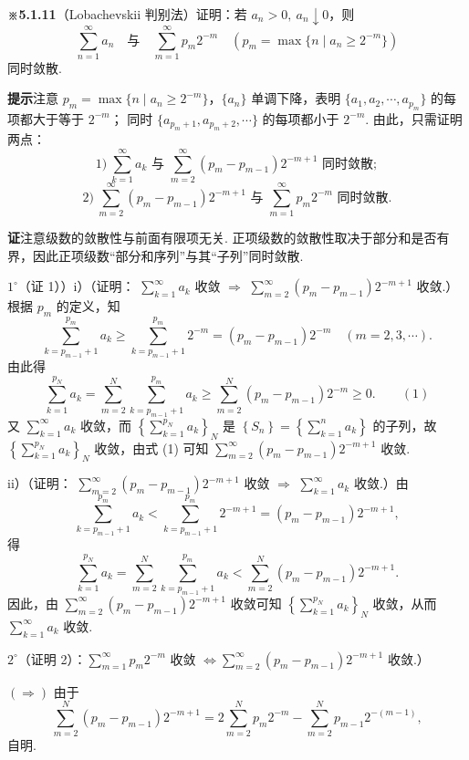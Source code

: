 \documentclass[UTF8,12pt,a4paper,fontset=fandol]{ctexart}
\begin{document}
\noindent\textbf{※5.1.11}\quad （Lobachevskii 判别法）证明：若 $a_n>0,\ a_n\downarrow0$，则
\[
  \sum_{n=1}^{\infty}a_n\quad\text{与}\quad
  \sum_{m=1}^{\infty}p_m2^{-m}\quad
  (p_m=\max\{n\mid a_n\ge2^{-m}\})
\]
同时敛散.

\noindent\textbf{提示}\quad 注意 $p_m=\max\{n\mid a_n\ge2^{-m}\}$，$\{a_n\}$ 单调下降，表明
$\{a_1,a_2,\cdots,a_{p_m}\}$ 的每项都大于等于 $2^{-m}$；
同时 $\{a_{p_m+1},a_{p_m+2},\cdots\}$ 的每项都小于 $2^{-m}$.
由此，只需证明两点：
\[
  1)\ \sum_{k=1}^{\infty}a_k\text{ 与 }
  \sum_{m=2}^{\infty}(p_m-p_{m-1})2^{-m+1}\text{ 同时敛散};
\]
\[
  2)\ \sum_{m=2}^{\infty}(p_m-p_{m-1})2^{-m+1}\text{ 与 }
  \sum_{m=1}^{\infty}p_m2^{-m}\text{ 同时敛散}.
\]

\noindent\textbf{证}\quad 注意级数的敛散性与前面有限项无关. 正项级数的敛散性取决于部分和是否有界，因此正项级数“部分和序列”与其“子列”同时敛散.

$1^\circ$（证 1））i）（证明：
$\sum_{k=1}^{\infty}a_k$ 收敛 $\Rightarrow$
$\sum_{m=2}^{\infty}(p_m-p_{m-1})2^{-m+1}$ 收敛.）根据 $p_m$ 的定义，知
\[
  \sum_{k=p_{m-1}+1}^{p_m}a_k
  \ge \sum_{k=p_{m-1}+1}^{p_m}2^{-m}
  =(p_m-p_{m-1})2^{-m}\quad(m=2,3,\cdots).
\]
由此得
\[
  \sum_{k=1}^{p_N}a_k
  =\sum_{m=2}^N\sum_{k=p_{m-1}+1}^{p_m}a_k
  \ge\sum_{m=2}^N(p_m-p_{m-1})2^{-m}\ge0.
\qquad(1)
\]
又 $\sum_{k=1}^{\infty}a_k$ 收敛，而
$\left\{\sum_{k=1}^{p_N}a_k\right\}_N$ 是
$\left\{S_n\right\}=\left\{\sum_{k=1}^n a_k\right\}$ 的子列，故
$\left\{\sum_{k=1}^{p_N}a_k\right\}_N$ 收敛，由式 (1) 可知
$\sum_{m=2}^{\infty}(p_m-p_{m-1})2^{-m+1}$ 收敛.

ii）（证明：
$\sum_{m=2}^{\infty}(p_m-p_{m-1})2^{-m+1}$ 收敛 $\Rightarrow$
$\sum_{k=1}^{\infty}a_k$ 收敛.）由
\[
  \sum_{k=p_{m-1}+1}^{p_m}a_k
  <\sum_{k=p_{m-1}+1}^{p_m}2^{-m+1}
  =(p_m-p_{m-1})2^{-m+1},
\]
得
\[
  \sum_{k=1}^{p_N}a_k
  =\sum_{m=2}^N\sum_{k=p_{m-1}+1}^{p_m}a_k
  <\sum_{m=2}^N(p_m-p_{m-1})2^{-m+1}.
\]
因此，由 $\sum_{m=2}^{\infty}(p_m-p_{m-1})2^{-m+1}$ 收敛可知
$\left\{\sum_{k=1}^{p_N}a_k\right\}_N$ 收敛，从而
$\sum_{k=1}^{\infty}a_k$ 收敛.

$2^\circ$（证明 2）：$\sum_{m=1}^{\infty}p_m2^{-m}$ 收敛
$\Leftrightarrow\sum_{m=2}^{\infty}(p_m-p_{m-1})2^{-m+1}$ 收敛.）

$(\Rightarrow)$ 由于
\[
  \sum_{m=2}^N(p_m-p_{m-1})2^{-m+1}
  =2\sum_{m=2}^Np_m2^{-m}
    -\sum_{m=2}^Np_{m-1}2^{-(m-1)},
\]
自明.
\end{document}
